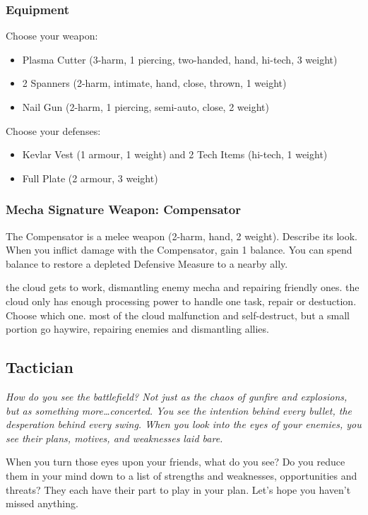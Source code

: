 
\subsubsection{Equipment}
Choose your weapon:
\begin{itemize}
\item Plasma Cutter (3-harm, 1 piercing, two-handed, hand, hi-tech, 3 weight)
\item 2 Spanners (2-harm, intimate, hand, close, thrown, 1 weight)
\item Nail Gun (2-harm, 1 piercing, semi-auto, close, 2 weight)
\end{itemize}

Choose your defenses:
\begin{itemize}
\item Kevlar Vest (1 armour, 1 weight) and 2 Tech Items (hi-tech, 1 weight)
\item Full Plate (2 armour, 3 weight)
\end{itemize}

\subsubsection{Mecha Signature Weapon: Compensator}
The Compensator is a melee weapon (2-harm, hand, 2 weight). Describe its look.
When you inflict damage with the Compensator, gain 1 balance. You can spend balance to restore a depleted Defensive Measure to a nearby ally.

{the cloud gets to work, dismantling enemy mecha and repairing friendly ones.}
{the cloud only has enough processing power to handle one task, repair or destuction. Choose which one.}
{most of the cloud malfunction and self-destruct, but a small portion go haywire, repairing enemies and dismantling allies.}

\subsection{Tactician}
{\itshape How do you see the battlefield? Not just as the chaos of
  gunfire and explosions, but as something more\ldots concerted. You
  see the intention behind every bullet, the desperation behind every
  swing. When you look into the eyes of your enemies, you see their
  plans, motives, and weaknesses laid bare.

When you turn those eyes upon your friends, what do you see? Do you
reduce them in your mind down to a list of strengths and weaknesses,
opportunities and threats? They each have their part to play in your
plan. Let's hope you haven't missed anything.}
